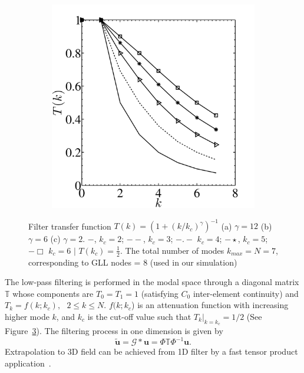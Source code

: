 \documentclass[times]{fldauth}
\begin{document}
\begin{figure}
\begin{subfigure}[b]{0.32\textwidth}
                 \caption{}
                 \label{fig:filt2}
         \end{subfigure}%
         \begin{subfigure}[b]{0.32\textwidth}
         \centering
                \includegraphics[width=\linewidth]{Figure/filter3.pdf}
                 \caption{}
                 \label{fig:filt3}
         \end{subfigure}
        \caption{Filter transfer function ${T}(k) = (1 + (k/k_{c})^\gamma)^{-1}$ (a) $\gamma = 12$ (b) $\gamma = 6$ (c) $\gamma = 2$.\hspace{2mm} $-$, $k_c = 2$; $--$, $k_c = 3$; $-.-$ $k_c = 4$; $-\star$, $k_c = 5$; $- \Box$ $k_c = 6$ $|$ ${T}(k_c) = \frac{1}{2}$. The total number of modes $k_{max} = N =7$, corresponding to GLL nodes = 8 (used in our simulation)}\label{fig:elem_filter}
\end{figure}

The low-pass filtering is performed in the modal space through a diagonal matrix $\mathbb{T}$ whose components are $T_0 = T_1 = 1$ (satisfying $C_0$ inter-element continuity) and $T_k = f(k;k_c) , \ \ \ 2\le k\le N$. $f(k;k_c$) is an attenuation function with increasing higher mode $k$, and $k_c$ is the cut-off value such that $T_k|_{k=k_c} = 1/2$ (See Figure~\ref{fig:elem_filter}). The filtering process in one dimension is given by
\begin{equation}
\widetilde{\mathbf{u}} = \mathcal{G}*\mathbf{u} = \Phi\mathbb{T}\Phi^{-1}\mathbf{u}.
\end{equation}
Extrapolation to 3D field can be achieved from 1D filter by a fast tensor product application~\cite{lynch}. 
\end{document}
